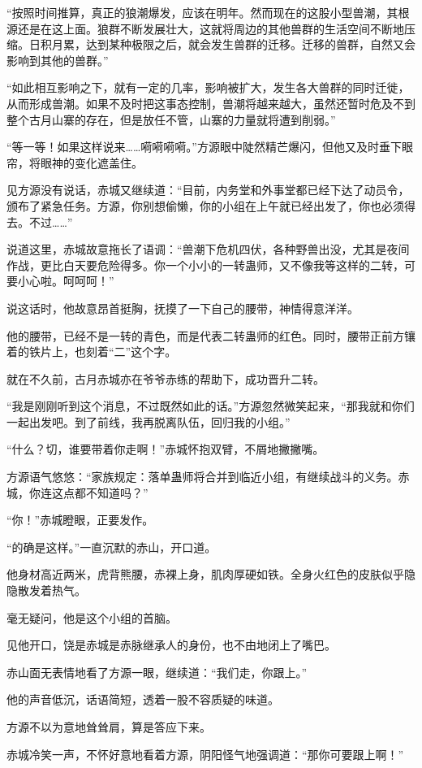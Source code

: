 \begin{this_body}
“按照时间推算，真正的狼潮爆发，应该在明年。然而现在的这股小型兽潮，其根源还是在这上面。狼群不断发展壮大，这就将周边的其他兽群的生活空间不断地压缩。日积月累，达到某种极限之后，就会发生兽群的迁移。迁移的兽群，自然又会影响到其他的兽群。”

“如此相互影响之下，就有一定的几率，影响被扩大，发生各大兽群的同时迁徙，从而形成兽潮。如果不及时把这事态控制，兽潮将越来越大，虽然还暂时危及不到整个古月山寨的存在，但是放任不管，山寨的力量就将遭到削弱。”

“等一等！如果这样说来……嗬嗬嗬嗬。”方源眼中陡然精芒爆闪，但他又及时垂下眼帘，将眼神的变化遮盖住。

见方源没有说话，赤城又继续道：“目前，内务堂和外事堂都已经下达了动员令，颁布了紧急任务。方源，你别想偷懒，你的小组在上午就已经出发了，你也必须得去。不过……”

说道这里，赤城故意拖长了语调：“兽潮下危机四伏，各种野兽出没，尤其是夜间作战，更比白天要危险得多。你一个小小的一转蛊师，又不像我等这样的二转，可要小心啦。呵呵呵！”

说这话时，他故意昂首挺胸，抚摸了一下自己的腰带，神情得意洋洋。

他的腰带，已经不是一转的青色，而是代表二转蛊师的红色。同时，腰带正前方镶着的铁片上，也刻着“二”这个字。

就在不久前，古月赤城亦在爷爷赤练的帮助下，成功晋升二转。

“我是刚刚听到这个消息，不过既然如此的话。”方源忽然微笑起来，“那我就和你们一起出发吧。到了前线，我再脱离队伍，回归我的小组。”

“什么？切，谁要带着你走啊！”赤城怀抱双臂，不屑地撇撇嘴。

方源语气悠悠：“家族规定：落单蛊师将合并到临近小组，有继续战斗的义务。赤城，你连这点都不知道吗？”

“你！”赤城瞪眼，正要发作。

“的确是这样。”一直沉默的赤山，开口道。

他身材高近两米，虎背熊腰，赤裸上身，肌肉厚硬如铁。全身火红色的皮肤似乎隐隐散发着热气。

毫无疑问，他是这个小组的首脑。

见他开口，饶是赤城是赤脉继承人的身份，也不由地闭上了嘴巴。

赤山面无表情地看了方源一眼，继续道：“我们走，你跟上。”

他的声音低沉，话语简短，透着一股不容质疑的味道。

方源不以为意地耸耸肩，算是答应下来。

赤城冷笑一声，不怀好意地看着方源，阴阳怪气地强调道：“那你可要跟上啊！”


\end{this_body}
